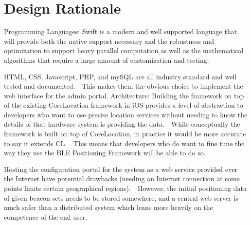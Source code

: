\chapter{Design Rationale}
Programming Languages:
Swift is a modern and well supported language that will provide both the native support necessary and the robustness and optimization to support heavy parallel computation as well as the mathematical algorithms that require a large amount of customization and testing.

HTML, CSS, Javascript, PHP, and mySQL are all industry standard and well tested and documented.  This makes them the obvious choice to implement the web interface for the admin portal.
\newline
Architecture:
Building the framework on top of the existing CoreLocation framework in iOS provides a level of abstraction to developers who want to use precise location services without needing to know the details of that hardware system is providing the data.  While conceptually the framework is built on top of CoreLocation, in practice it would be more accurate to say it extends CL.  This means that developers who do want to fine tune the way they use the BLE Positioning Framework will be able to do so.  

Hosting the configuration portal for the system as a web service provided over the Internet have potential drawbacks (needing an Internet connection at some points limits certain geographical regions).  However, the initial positioning data of given beacon sets needs to be stored somewhere, and a central web server is much safer than a distributed system which leans more heavily on the competence of the end user.
